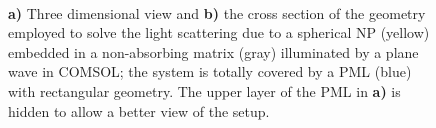 \begin{figure}[b!]
	\centering
     \small
     \def\svgwidth{.8\textwidth}
     \hspace*{-.2\textwidth}
       \begin{subfigure}{.2\textwidth}\caption{ }\label{fig:setup:a}\end{subfigure}%
     \hspace*{-6em}%
       \begin{subfigure}{.78\textwidth}\caption{ }\label{fig:setup:b}\end{subfigure}
     \vspace*{-2.5em}\\
 \vspace*{0em}
\caption[Boxed Particle Setup in COMSOL]{\textbf{a)} Three dimensional view and \textbf{b)} the cross section of the geometry employed to solve the light scattering due to a  spherical NP (yellow) embedded in a non-absorbing matrix (gray) illuminated by a plane wave in COMSOL; the system is totally covered by a PML (blue) with rectangular geometry. The upper layer of the PML in \textbf{a)} is hidden to allow a better view of the setup.}
\label{fig:setup}
\end{figure}
%
